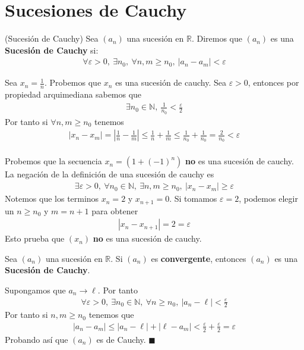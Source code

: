\documentclass[12pt]{book}
\renewenvironment{proof}[1][\textit{Demostración}]{%
  \par\noindent{\bfseries #1.}\enspace}{\hfill$\blacksquare$\par}
\begin{document}
 \section{Sucesiones de Cauchy}

 \begin{defi}{(Sucesión de Cauchy)}{}
     Sea $(a_n)$ una sucesión en $\mathbb{R}$. Diremos que $(a_n)$ es una \textbf{Sucesión de Cauchy} si:
     \begin{align*}
         \forall \varepsilon>0, \ \exists n_0 , \ \forall n,m \geq n_0, \ |a_n - a_m| < \varepsilon
     \end{align*}
 \end{defi}

 \begin{eje}{}{}
     Sea $x_n=\displaystyle \frac{1}{n}$. Probemos que $x_n$ es una sucesión de cauchy. Sea $\varepsilon>0$, entonces por propiedad arquimediana sabemos que 
     \begin{align*}
        \exists n_0 \in \mathbb{N}, \  \frac{1}{n_0}< \frac{\varepsilon}{2}
     \end{align*}
     Por tanto si $\forall n, m \geq n_0$ tenemos 
     \begin{align*}
         |x_n-x_m| = \left| \frac{1}{n}- \frac{1}{m}\right|\leq \frac{1}{n}+\frac{1}{m} \leq \frac{1}{n_0}+ \frac{1}{n_0}=\frac{2}{n_0}<\varepsilon\\
     \end{align*}
 \end{eje}
\begin{eje}{}{}
    Probemos que la secuencia $x_n= (1+(-1)^n)$ \textbf{no} es una sucesión de cauchy. La negación de la definición de una sucesión de cauchy es 
    \begin{align*}
        \exists \varepsilon>0, \  \forall n_0 \in \mathbb{N}, \ \exists n,m \geq n_0, \ |x_n -x_m| \geq \varepsilon   \end{align*}
        Notemos que los terminos $x_n=2$ y $x_{n+1}=0$. Si tomamos $\varepsilon=2$, podemos elegir un $n \geq n_0$ y $m=n+1$ para obtener
        \begin{align*}
            |x_n - x_{n+1}|=2=\varepsilon
        \end{align*}
        Esto prueba que $(x_n)$ \textbf{no} es una sucesión de cauchy.
\end{eje}
\begin{prop}{}{}
    Sea $(a_n)$ una sucesión en $\mathbb{R}$. Si $(a_n)$ es \textbf{convergente}, entonces $(a_n)$ es una \textbf{Sucesión de Cauchy}.
\end{prop}
\begin{proof}
    Supongamos que $a_n \to \ell$. Por tanto 
    \begin{align*}
        \forall \varepsilon>0, \ \exists n_0 \in \mathbb{N}, \ \forall n\geq n_0, \ |a_n- \ell | < \frac{\varepsilon}{2}
    \end{align*}
    Por tanto si $n,m\geq n_0$ tenemos que 
    \begin{align*}
        |a_n-a_m| \leq |a_n - \ell | + |\ell - a_m| < \frac{\varepsilon}{2}+\frac{\varepsilon}{2}=\varepsilon
    \end{align*}
    Probando así que  $(a_n)$ es de Cauchy.
\end{proof}
\end{document}
